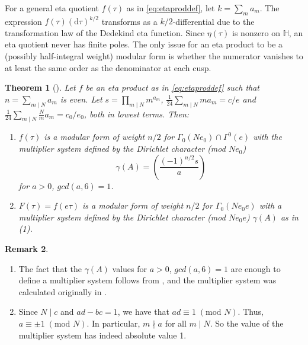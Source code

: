 \documentclass[11pt,a4paper]{amsart}
\newtheorem{theorem}{Theorem}[section]
\theoremstyle{definition}
\newtheorem{remark}[theorem]{Remark}
\begin{document}
For a general eta quotient $f(\tau)$ as in \eqref{eq:etaproddef}, let $k=\sum_m{a_m}$. The expression $f(\tau)(\mathrm{d}\tau)^{k/2}$ transforms as a $k/2$-differential due to the transformation law of the Dedekind eta function. Since $\eta(\tau)$ is nonzero on $\mathbb{H}$, an eta quotient never has finite poles. The only issue for an eta product to be a (possibly half-integral weight) modular form is whether the numerator vanishes to at least the same order as the denominator at each cusp.

\begin{theorem}[{\cite[Theorem 3]{gordon1993multiplicative}}] 
\label{thm:etaprodmodeven}	
	Let $f$ be an eta product as in \eqref{eq:etaproddef} such that $n=\sum_{m \mid N} a_m$ is even. Let $s=\prod_{m \mid N} m^{a_m}$,  $\frac{1}{24}\sum_{m \mid N} ma_m=c/e$ and $\frac{1}{24}\sum_{m \mid N} \frac{N}{m}a_m=c_0/e_0$, both in lowest terms. Then:
\begin{enumerate}
	\item $f(\tau)$ is a modular form of weight $n/2$ for $\Gamma_0(Ne_0)\cap\Gamma^0(e)$ with the multiplier system defined by the Dirichlet character (mod $Ne_0$)
	\[ \gamma(A)=\left( \frac{(-1)^{n/2} s}{a} \right) \]
	for $a>0$, $gcd(a,6)=1$.
	\item $F(\tau)=f(e\tau)$ is a modular form of weight $n/2$ for $\Gamma_0(Ne_0e)$ with a multiplier system defined by the Dirichlet character (mod $Ne_0e$) $\gamma(A)$ as in (1).
\end{enumerate}
\end{theorem}
\begin{remark}
	\label{rem:multsyst}
\begin{enumerate}
\item The fact that the $\gamma(A)$ values for $a>0$, $gcd(a,6)=1$ are enough to define a multiplier system follows from \cite[Lemma 3]{newman1959construction}, and the multiplier system was calculated originally in \cite[Theorem 1]{newman1959construction}.
\item\label{it:multsyst2} Since $N  \mid c$ and $ad-bc=1$, we have that $ad \equiv 1  \;(\textrm{mod }N)$. Thus, $a \equiv \pm 1  \;(\textrm{mod }N)$. In particular, $m \nmid a$ for all $m \mid N$. So the value of the multiplier system has indeed absolute value 1.
\end{enumerate}
\end{remark}
\end{document}
